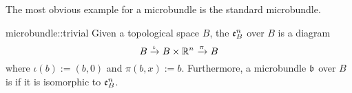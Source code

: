\begin{myparagraph}
    The most obvious example for a microbundle is the standard microbundle.
\end{myparagraph}

\begin{myexample}{microbundle::trivial}
    Given a topological space $B$, the  $\mathfrak{e}^{n}_B$ over $B$ is a diagram
    \[ B \xrightarrow{\iota} B \times \mathbb{R}^n \xrightarrow{\pi} B{} \]
    where $\iota(b) := (b, 0)$ and $\pi(b, x) := b$.
    Furthermore, a microbundle $\mathfrak{b}$ over $B$ is  if it is isomorphic to $\mathfrak{e}^{n}_B$.
\end{myexample}